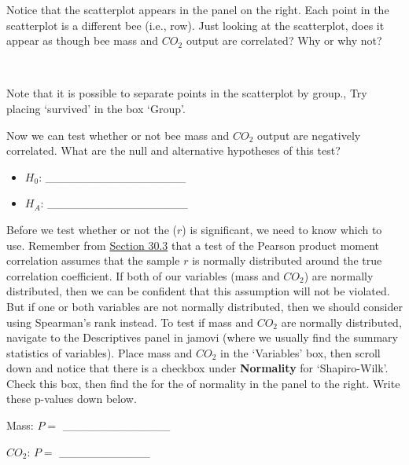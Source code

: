 \documentclass[
  openany]{krantz}
\begin{document}
Notice that the scatterplot appears in the panel on the right.
Each point in the scatterplot is a different bee (i.e., row).
Just looking at the scatterplot, does it appear as though bee mass and \(CO_2\) output are correlated?
Why or why not?

\begin{verbatim}


\end{verbatim}

Note that it is possible to separate points in the scatterplot by group.,
Try placing `survived' in the box `Group'.

Now we can test whether or not bee mass and \(CO_{2}\) output are negatively correlated.
What are the null and alternative hypotheses of this test?

\begin{itemize}
\item
  \(H_{0}\): \_\_\_\_\_\_\_\_\_\_\_\_\_\_\_\_\_
\item
  \(H_{A}\): \_\_\_\_\_\_\_\_\_\_\_\_\_\_\_\_\_
\end{itemize}

Before we test whether or not the  (\(r\)) is significant, we need to know which  to use.
Remember from \protect\hyperlink{correlation-hypothesis-testing}{Section 30.3} that a test of the Pearson product moment correlation assumes that the sample \(r\) is normally distributed around the true correlation coefficient.
If both of our variables (mass and \(CO_{2}\)) are normally distributed, then we can be confident that this assumption will not be violated.
But if one or both variables are not normally distributed, then we should consider using Spearman's rank  instead.
To test if mass and \(CO_{2}\) are normally distributed, navigate to the Descriptives panel in jamovi (where we usually find the summary statistics of variables).
Place mass and \(CO_{2}\) in the `Variables' box, then scroll down and notice that there is a checkbox under \textbf{Normality} for `Shapiro-Wilk'.
Check this box, then find the  for the  of normality in the panel to the right.
Write these p-values down below.

Mass: \(P =\) \_\_\_\_\_\_\_\_\_\_\_\_\_

\(CO_{2}\): \(P =\) \_\_\_\_\_\_\_\_\_\_\_
\end{document}
